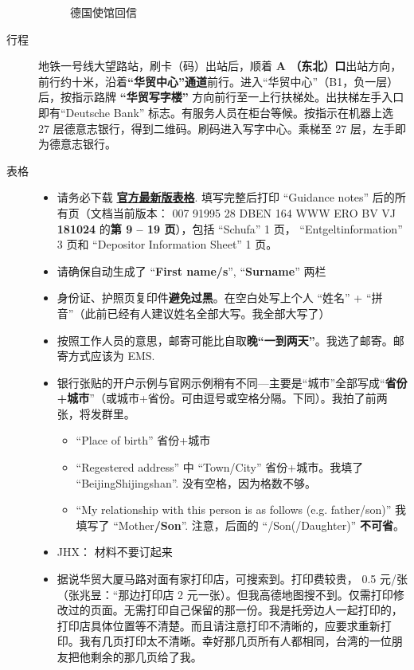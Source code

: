 \documentclass{article}
\begin{document}
\begin{description}
\begin{figure}[htbp]
  \caption{德国使馆回信}
  \label{fig:email}
\end{figure}
\item[行程] 地铁一号线大望路站，刷卡（码）出站后，顺着 \textbf{\color{blue}A （东北）口}出站方向，前行约十米，沿着\textbf{\color{blue}“华贸中心”通道}前行。进入“华贸中心”（B1，负一层）后，按指示路牌 \textbf{\color{blue}“华贸写字楼”} 方向前行至一上行扶梯处。出扶梯左手入口即有``Deutsche Bank'' 标志。有服务人员在柜台等候。按指示在机器上选 27 层德意志银行，得到二维码。刷码进入写字中心。乘梯至 27 层，左手即为德意志银行。
\item[表格]
\begin{itemize}
  \item 请务必下载 \href{https://china.db.com/china/docs/1.opening\_a\_bank\_account\_for\_foreign\_students\_over18years.pdf}{\textbf{\color{blue}官方最新版表格}}. 填写完整后打印 ``Guidance notes'' 后的所有页（文档当前版本：
  007 91995 28 DBEN 164 WWW ERO BV VJ \textbf{\color{blue}181024} 的\textbf{\color{blue}第 9 -- 19 页}），包括 ``Schufa'' 1 页， ``Entgeltinformation'' 3 页和 ``Depositor Information Sheet'' 1 页。 
  \item 请确保自动生成了 ``\textbf{\color{blue}First name/s}'', ``\textbf{\color{blue}Surname}'' 两栏
  \item 身份证、护照页复印件\textbf{避免过黑}。在空白处写上个人 “姓名” + “拼音”（此前已经有人建议姓名全部大写。我全部大写了）
  \item 按照工作人员的意思，邮寄可能比自取\textbf{\color{blue}晚“一到两天”}。我选了邮寄。邮寄方式应该为 EMS.
  \item 银行张贴的开户示例与官网示例稍有不同---主要是“城市”全部写成“\textbf{\color{blue}省份+城市}”（或城市+省份。可由逗号或空格分隔。下同）。我拍了前两张，将发群里。
  \begin{itemize}
    \item ``Place of birth'' 省份+城市
    \item ``Regestered address'' 中 ``Town/City'' 省份+城市。我填了 ``BeijingShijingshan''. 没有空格，因为格数不够。
    \item ``My relationship with this person is as follows (e.g. father/son)'' 我填写了 ``Mother\textbf{\color{blue}/Son}''. 注意，后面的 ``/Son(/Daughter)'' \textbf{\color{blue}不可省}。
  \end{itemize}
\item JHX： 材料不要订起来
\item 据说华贸大厦马路对面有家打印店，可搜索到。打印费较贵， 0.5 元/张（张兆昱：“那边打印店 2 元一张）。但我高德地图搜不到。仅需打印修改过的页面。{\color{blue}无需打印自己保留的那一份}。我是托旁边人一起打印的，打印店具体位置等不清楚。而且请注意{\color{blue}打印不清晰的，应要求重新打印}。我有几页打印太不清晰。幸好那几页所有人都相同，台湾的一位朋友把他剩余的那几页给了我。

\end{itemize}
\end{description}
\end{document}
